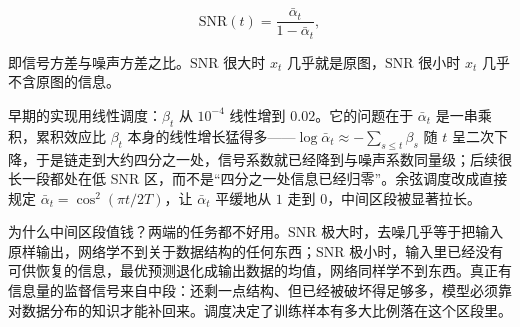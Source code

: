 \[
\mathrm{SNR}(t) = \frac{\bar\alpha_t}{1-\bar\alpha_t},
\]

即信号方差与噪声方差之比。\(\mathrm{SNR}\) 很大时 \(x_t\) 几乎就是原图，\(\mathrm{SNR}\) 很小时 \(x_t\) 几乎不含原图的信息。

早期的实现用线性调度：\(\beta_t\) 从 \(10^{-4}\) 线性增到 \(0.02\)。它的问题在于 \(\bar\alpha_t\) 是一串乘积，累积效应比 \(\beta_t\) 本身的线性增长猛得多——\(\log\bar\alpha_t\approx-\sum_{s\le t}\beta_s\) 随 \(t\) 呈二次下降，于是链走到大约四分之一处，信号系数就已经降到与噪声系数同量级；后续很长一段都处在低 SNR 区，而不是``四分之一处信息已经归零''。余弦调度改成直接规定 \(\bar\alpha_t = \cos^2(\pi t/2T)\)，让 \(\bar\alpha_t\) 平缓地从 \(1\) 走到 \(0\)，中间区段被显著拉长。

为什么中间区段值钱？两端的任务都不好用。\(\mathrm{SNR}\) 极大时，去噪几乎等于把输入原样输出，网络学不到关于数据结构的任何东西；\(\mathrm{SNR}\) 极小时，输入里已经没有可供恢复的信息，最优预测退化成输出数据的均值，网络同样学不到东西。真正有信息量的监督信号来自中段：还剩一点结构、但已经被破坏得足够多，模型必须靠对数据分布的知识才能补回来。调度决定了训练样本有多大比例落在这个区段里。

